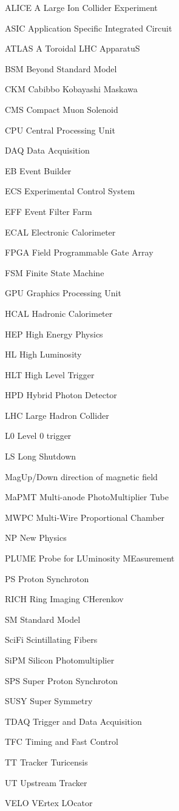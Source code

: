 \begin{abbreviations}
    \item[ALICE] A Large Ion Collider Experiment
    \item[ASIC] Application Specific Integrated Circuit
    \item[ATLAS] A Toroidal LHC ApparatuS
    \item[BSM] Beyond Standard Model
    \item[CKM] Cabibbo Kobayashi Maskawa
    \item[CMS] Compact Muon Solenoid
    \item[CPU] Central Processing Unit
    \item[DAQ] Data Acquisition
    \item[EB] Event Builder
    \item[ECS] Experimental Control System
    \item[EFF] Event Filter Farm
    \item[ECAL] Electronic Calorimeter
    \item[FPGA] Field Programmable Gate Array
    \item[FSM] Finite State Machine
    \item[GPU] Graphics Processing Unit
    \item[HCAL] Hadronic Calorimeter
    \item[HEP] High Energy Physics
    \item[HL] High Luminosity
    \item[HLT] High Level Trigger
    \item[HPD] Hybrid Photon Detector
    \item[LHC] Large Hadron Collider
    \item[L0] Level 0 trigger
    \item[LS] Long Shutdown
    \item[MagUp/Down] direction of magnetic field
    \item[MaPMT] Multi-anode PhotoMultiplier Tube
    \item[MWPC] Multi-Wire Proportional Chamber
    \item[NP] New Physics
    \item[PLUME] Probe for LUminosity MEasurement
    \item[PS] Proton Synchroton
    \item[RICH] Ring Imaging CHerenkov
    \item[SM] Standard Model
    \item[SciFi] Scintillating Fibers
    \item[SiPM] Silicon Photomultiplier
    \item[SPS] Super Proton Synchroton
    \item[SUSY] Super Symmetry
    \item[TDAQ] Trigger and Data Acquisition
    \item[TFC] Timing and Fast Control
    
    \item[TT] Tracker Turicensis
    \item[UT] Upstream Tracker
    \item[VELO] VErtex LOcator
\end{abbreviations}

